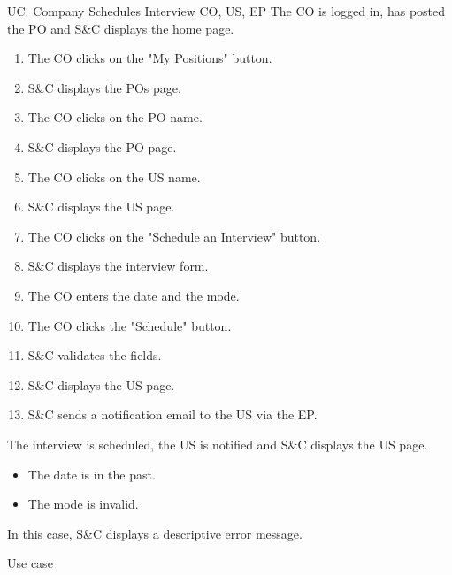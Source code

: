 \clearpage
\begin{usecase}
    {UC\theuc. Company Schedules Interview}
    {CO, US, EP}
    {The CO is logged in, has posted the PO and S\&C displays the home page.}
    {\begin{enumerate}[leftmargin=*]
        \item The CO clicks on the "My Positions" button.
        \item S\&C displays the POs page.
        \item The CO clicks on the PO name.
        \item S\&C displays the PO page.
        \item The CO clicks on the US name.
        \item S\&C displays the US page.
        \item The CO clicks on the "Schedule an Interview" button.
        \item S\&C displays the interview form.
        \item The CO enters the date and the mode.
        \item The CO clicks the "Schedule" button.
        \item S\&C validates the fields.
        \item S\&C displays the US page.
        \item S\&C sends a notification email to the US via the EP.
    \end{enumerate}}
    {The interview is scheduled, the US is notified and S\&C displays the US page.}
    {\begin{itemize}[leftmargin=*, label=\tiny\textbullet]
        \item The date is in the past.
        \item The mode is invalid.
    \end{itemize}
    In this case, S\&C displays a descriptive error message.}
    {Use case \theuc}
\end{usecase}

